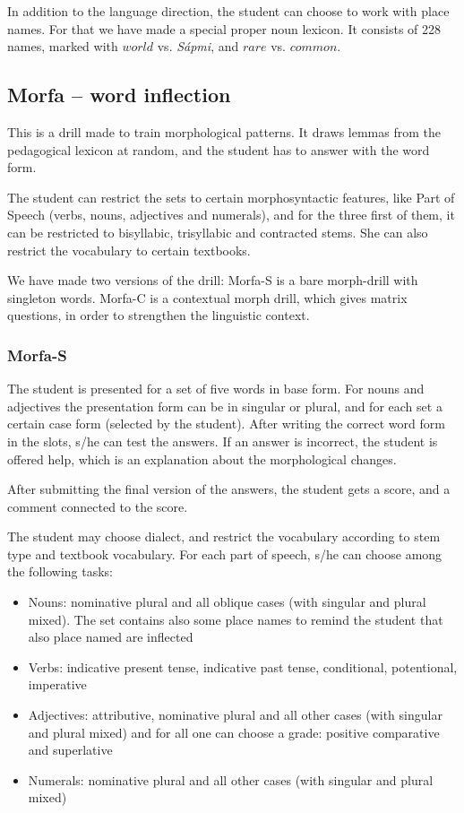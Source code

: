 \documentclass[a4paper,12pt]{article}
\begin{document}
\vspace{0.5cm}
In addition to the language direction, the student can choose to work with place names. For that we have made a special proper noun lexicon. It consists of 228 names, marked with $world$ vs. \textit{Sápmi}, and $rare$ vs. $common$. 


\subsection{Morfa -- word inflection}
This is a drill made to train morphological patterns. It draws lemmas from the pedagogical lexicon at random, and the student has to answer with the word form. 

The student can restrict the sets to certain morphosyntactic features, like Part of Speech (verbs, nouns, adjectives and numerals), and for the three first of them, it can be restricted to bisyllabic, trisyllabic and contracted stems. She can also restrict the vocabulary to certain textbooks.

We have made two versions of the drill: Morfa-S is a bare morph-drill with singleton words. Morfa-C is a contextual morph drill, which gives matrix questions, in order to strengthen the linguistic context.

\subsubsection{Morfa-S}
The student is presented for a set of five words in base form. For nouns and adjectives the presentation form can be in singular or plural, and for each set a certain case form (selected by the student). After writing the correct word form in the slots, s/he can test the answers. If an answer is incorrect, the student is offered help, which is an explanation about the morphological changes.

After submitting the final version of the answers, the student gets a score, and a comment connected to the score.

The student may choose dialect, and restrict the vocabulary according to stem type and textbook vocabulary. For each part of speech, s/he can choose among the following tasks:
\begin{itemize}
\item Nouns: nominative plural and all oblique cases (with singular and plural mixed). The set contains also some place names to remind the student that also place named are inflected
\item Verbs: indicative present tense, indicative past tense, conditional, potentional, imperative
\item Adjectives: attributive, nominative plural and all other cases (with singular and plural mixed) and for all one can choose a grade: positive comparative and superlative
\item Numerals: nominative plural and all other cases (with singular and plural mixed)
\end{itemize}
\vspace{0.5cm}
\end{document}
